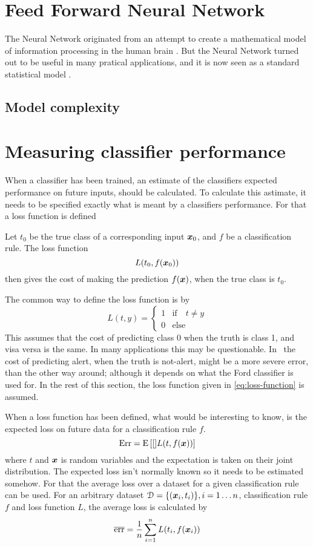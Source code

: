 \section{Feed Forward Neural Network}\label{sec:feed-forward-neural-network}
The Neural Network originated from an attempt to create a mathematical model of information processing in the human brain \citep[p.226]{bishop}. But the Neural Network turned out to be useful in many pratical applications, and it is now seen as a standard statistical model \citep[p.392]{hastie09}.
\subsection{Model complexity}



\section{Measuring classifier performance}\label{sec:classifier-performance}
When a classifier has been trained, an estimate of the classifiers expected performance on future inputs, should be calculated. To calculate this astimate, it needs to be specified exactly what is meant by a classifiers performance. For that a loss function is defined
\begin{definition}
    Let $t_0$ be the true class of a corresponding input $\boldsymbol{x}_0$, and $f$ be a classification rule. The loss function
    \[
        L(t_0, f(\boldsymbol{x}_0))
    \]
    then gives the cost of making the prediction $f(\boldsymbol{x})$, when the true class is $t_0$.
\end{definition}
The common way to define the loss function is by
\begin{equation}\label{eq:loss-function}
    L(t, y) = \begin{cases}
        1 & \text{if}\quad t\neq y \\
        0 & \text{else}
    \end{cases}
\end{equation}
This assumes that the cost of predicting class 0 when the truth is class 1, and visa versa is the same. In many applications this may be questionable. In \TFC\ the cost of predicting alert, when the truth is not-alert, might be a more severe error, than the other way around; although it depends on what the Ford classifier is used for. In the rest of this section, the loss function given in \eqref{eq:loss-function} is assumed. \par
When a loss function has been defined, what would be interesting to know, is the expected loss on future data for a classification rule $f$.
\[
    \text{Err} = \text{E}\,[[]L(t, f(\boldsymbol{x}))]
\]
where $t$ and $\boldsymbol{x}$ is random variables and the expectation is taken on their joint distribution. The expected loss isn't normally known so it needs to be estimated somehow. For that the average loss over a dataset for a given classification rule can be used. For an arbitrary dataset $\mathcal{D}=\{(\boldsymbol{x}_i, t_i)\}, i=1\dots n$, classification rule $f$ and loss function $L$, the average loss is calculated by
\[
    \overline{\text{err}} = \frac{1}{n}\sum_{i=1}^n L(t_i, f(\boldsymbol{x}_i))
\]

